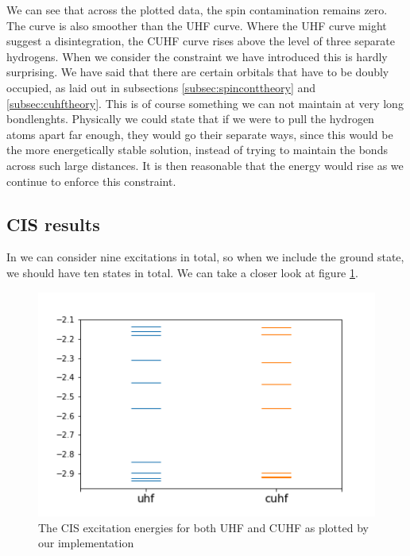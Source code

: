 \documentclass[twoside,twocolumn,9pt]{article}
\begin{document}
We can see that across the plotted data, the spin contamination remains zero. The curve is also smoother than the UHF curve. Where
the UHF curve might suggest a disintegration, the CUHF curve rises above the level of three separate hydrogens. When we consider the constraint we have introduced this is hardly
surprising. We have said that there are certain orbitals that have to be doubly occupied, as laid out in subsections \ref{subsec:spinconttheory} and \ref{subsec:cuhftheory}.
This is of course something we can not maintain at very long bondlenghts. Physically we could state that if we were to pull the hydrogen atoms apart far enough, they would go
their separate ways, since this would be the more energetically stable solution, instead of trying to maintain the bonds across such large distances. It is then reasonable that
the energy would rise as we continue to enforce this constraint.

\subsection{CIS results}
\label{subsec:cis}
 In  we can consider nine excitations in total, so when we include the ground state, we should have ten states in total. We can take a closer look at
figure \ref{fig:h3_cis}.

\begin{center}
  \begin{figure}[h]
    \includegraphics[width=\linewidth]{./../notes/figures/h3_cis.png}
    \caption{The CIS excitation energies for both UHF and CUHF as plotted by our implementation}
    \label{fig:h3_cis}
  \end{figure}
\end{center}
\end{document}
